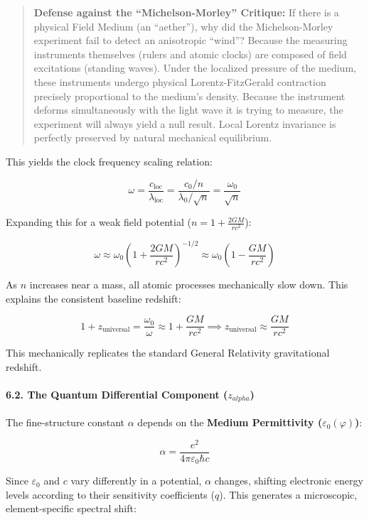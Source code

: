 \documentclass[
]{article}
\begin{document}
\begin{quote}
\textbf{Defense against the ``Michelson-Morley'' Critique:} If there is
a physical Field Medium (an ``aether''), why did the Michelson-Morley
experiment fail to detect an anisotropic ``wind''? Because the measuring
instruments themselves (rulers and atomic clocks) are composed of field
excitations (standing waves). Under the localized pressure of the
medium, these instruments undergo physical Lorentz-FitzGerald
contraction precisely proportional to the medium's density. Because the
instrument deforms simultaneously with the light wave it is trying to
measure, the experiment will always yield a null result. Local Lorentz
invariance is perfectly preserved by natural mechanical equilibrium.
\end{quote}

This yields the clock frequency scaling relation:

\[ \omega = \frac{c_{\text{loc}}}{\lambda_{\text{loc}}} = \frac{c_0 / n}{\lambda_0 / \sqrt{n}} = \frac{\omega_0}{\sqrt{n}} \]

Expanding this for a weak field potential
(\(n = 1 + \frac{2GM}{rc^2}\)):

\[ \omega \approx \omega_0 \left( 1 + \frac{2GM}{rc^2} \right)^{-1/2} \approx \omega_0 \left( 1 - \frac{GM}{rc^2} \right) \]

As \(n\) increases near a mass, all atomic processes mechanically slow
down. This explains the consistent baseline redshift:

\[ 1 + z_{\text{universal}} = \frac{\omega_0}{\omega} \approx 1 + \frac{GM}{rc^2} \implies z_{\text{universal}} \approx \frac{GM}{rc^2} \]

This mechanically replicates the standard General Relativity
gravitational redshift.

\paragraph{\texorpdfstring{6.2. The Quantum Differential Component
(\(z_{alpha}\))}{6.2. The Quantum Differential Component (z\_\{alpha\})}}\label{the-quantum-differential-component-z_alpha}

The fine-structure constant \(\alpha\) depends on the \textbf{Medium
Permittivity (\(\varepsilon_0(\varphi)\))}:

\[\alpha = \frac{e^2}{4\pi \varepsilon_0 \hbar c}\]

Since \(\varepsilon_0\) and \(c\) vary differently in a potential,
\(\alpha\) changes, shifting electronic energy levels according to their
sensitivity coefficients (\(q\)). This generates a microscopic,
element-specific spectral shift:
\end{document}
